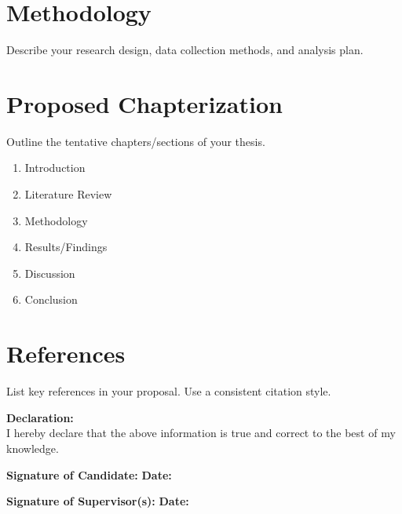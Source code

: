 \documentclass[12pt,a4paper]{article}
\begin{document}
\section{Methodology}
\begin{spacing}{1.2}
Describe your research design, data collection methods, and analysis plan.
\end{spacing}

\section{Proposed Chapterization}
\begin{spacing}{1.2}
Outline the tentative chapters/sections of your thesis.
\begin{enumerate}[label=Chapter \arabic*:]
    \item Introduction
    \item Literature Review
    \item Methodology
    \item Results/Findings
    \item Discussion
    \item Conclusion
\end{enumerate}
\end{spacing}

\section{References}
\begin{spacing}{1.2}
List key references in your proposal. Use a consistent citation style.
\end{spacing}

\vfill
\noindent\textbf{Declaration:}\\
I hereby declare that the above information is true and correct to the best of my knowledge.

\vspace{2em}
\noindent\textbf{Signature of Candidate:} \underline{\hspace{5cm}} \hfill \textbf{Date:} \underline{\hspace{3cm}}

\vspace{2em}
\noindent\textbf{Signature of Supervisor(s):} \underline{\hspace{5cm}} \hfill \textbf{Date:} \underline{\hspace{3cm}}
\end{document}
